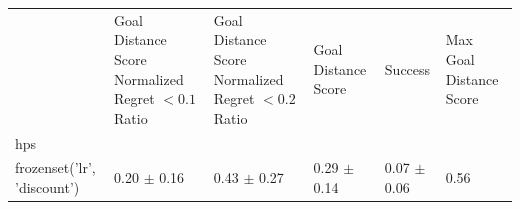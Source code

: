\begin{tabular}{llllll}
\toprule
 & Goal Distance Score Normalized Regret $< 0.1$ Ratio & Goal Distance Score Normalized Regret $< 0.2$ Ratio & Goal Distance Score & Success & Max Goal Distance Score \\
hps &  &  &  &  &  \\
\midrule
frozenset({'lr', 'discount'}) & 0.20 $\pm$ 0.16 & 0.43 $\pm$ 0.27 & 0.29 $\pm$ 0.14 & 0.07 $\pm$ 0.06 & 0.56 \\
\bottomrule
\end{tabular}
